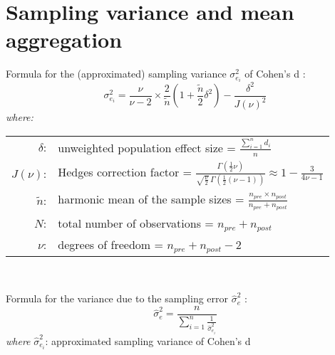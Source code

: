 

\newpage
\section{Sampling variance and mean aggregation}
\label{appendix:samplingvar_mean}

\par Formula for the (approximated) sampling variance $\sigma^2_{e_{i}}$ of Cohen's d \parencite{borenstein2021introduction, goulet2018review, morris2002combining}:
\begin{equation} \label{eq:variance_sampling}
    \sigma^2_{e_{i}} = \frac{\nu}{\nu - 2} \times \frac{2}{\tilde{n}} \left( 1 + \frac{\tilde{n}}{2} \delta^2 \right) - \frac{\delta^2}{J(\nu)^2}
\end{equation}
\hspace{0.5cm} \textit{where:} \\
\hspace*{3em}
\begin{tabular}{rl}
    $\delta$:& unweighted population effect size = $\frac{\sum_{i=1}^{n} d_{i}}{n}$ \\
    $J(\nu)$:& Hedges correction factor = $\frac{\Gamma\left(\frac{1}{2} \nu\right)}{\sqrt{\frac{\nu}{2}} \, \Gamma\left(\frac{1}{2} (\nu - 1)\right)} \approx 1 - \frac{3}{4 \nu - 1}$ \parencite{hedges1981distribution} \\
    $\tilde{n}$:& harmonic mean of the sample sizes = $\frac{n_{pre} \times n_{post}}{n_{pre} + n_{post}}$ \\
    $N$:& total number of observations = $n_{pre} + n_{post}$ \\
    $\nu$:& degrees of freedom = $n_{pre} + n_{post} - 2$ \\
\end{tabular} \\

\par Formula for the variance due to the sampling error $\hat{\sigma}^2_{e}$ \parencite{morris2002combining}:
\begin{equation} \label{eq:variance_sampling_total}
    \hat{\sigma}^2_{e} = \frac{n}{\sum_{i=1}^{n} \frac{1}{\hat{\sigma}^2_{e_{i}}}}
\end{equation}
\hspace{0.5cm} \textit{where} $\hat{\sigma}^2_{e_{i}}$: approximated sampling variance of Cohen's d


